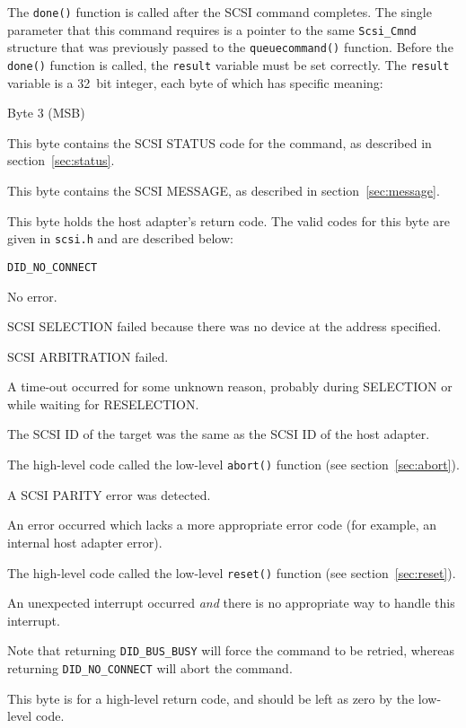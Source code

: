 The \verb|done()| function is called after the SCSI command completes.  The
single parameter that this command requires is a pointer to the same
\verb|Scsi_Cmnd| structure that was previously passed to the
\verb|queuecommand()| function.  Before the \verb|done()| function is
called, the \verb|result| variable must be set correctly.  The
\verb|result| variable is a 32~bit integer, each byte of which has
specific meaning:
\begin{desc}{Byte 3 (MSB)}
\item[Byte 0 (LSB)] This byte contains the SCSI STATUS code for the
  command, as described in section~\ref{sec:status}.
\item[Byte 1] This byte contains the SCSI MESSAGE, as described in
  section~\ref{sec:message}.
\item[Byte 2] This byte holds the host adapter's return code.  The valid
  codes for this byte are given in \verb|scsi.h| and are described below:
  \begin{desc}{{\tt DID\_NO\_CONNECT}}
  \item[{\tt DID\_OK}] No error.
  \item[{\tt DID\_NO\_CONNECT}] SCSI SELECTION failed because there was no
    device at the address specified.
  \item[{\tt DID\_BUS\_BUSY}] SCSI ARBITRATION failed.
  \item[{\tt DID\_TIME\_OUT}] A time-out occurred for some unknown reason,
    probably during SELECTION or while waiting for RE\-SE\-LEC\-TION\@.
  \item[{\tt DID\_BAD\_TARGET}] The SCSI ID of the target was the same as
    the SCSI ID of the host adapter.
  \item[{\tt DID\_ABORT}] The high-level code called the low-level
    \verb|abort()| function (see section~\ref{sec:abort}).
  \item[{\tt DID\_PARITY}] A SCSI PARITY error was detected.
  \item[{\tt DID\_ERROR}] An error occurred which lacks a more appropriate
    error code (for example, an internal host adapter error).
  \item[{\tt DID\_RESET}] The high-level code called the low-level
    \verb|reset()| function (see section~\ref{sec:reset}).
  \item[{\tt DID\_BAD\_INTR}] An unexpected interrupt occurred {\em and\/}
    there is no appropriate way to handle this interrupt.
  \end{desc}

  Note that returning \verb|DID_BUS_BUSY| will force the command to be
  retried, whereas returning \verb|DID_NO_CONNECT| will abort the command.
\item[Byte 3 (MSB)] This byte is for a high-level return code, and should
  be left as zero by the low-level code.
\end{desc}

